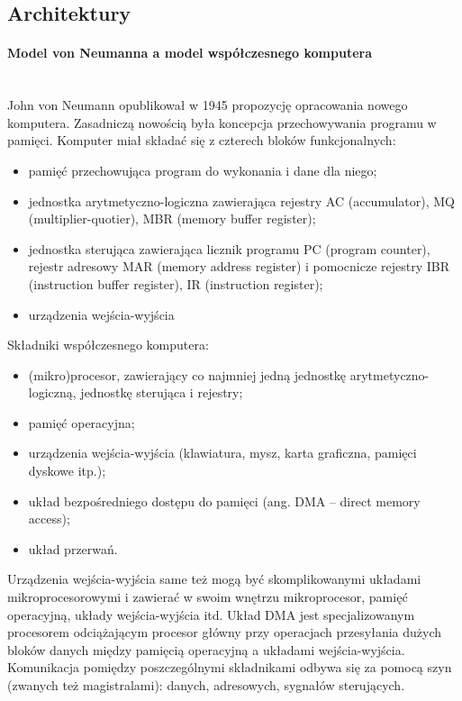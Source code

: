 \documentclass[a4paper,twoside]{report}
\begin{document}
\subsection{Architektury} 
 
\paragraph{Model von Neumanna a model współczesnego komputera\\\\} 
John von Neumann opublikował w 1945 propozycję opracowania nowego komputera. Zasadniczą nowością była
koncepcja przechowywania programu w pamięci. Komputer miał składać się z czterech bloków funkcjonalnych:
\begin{itemize}
\item pamięć przechowująca program do wykonania i dane dla niego;
\item jednostka arytmetyczno-logiczna zawierająca rejestry AC (accumulator), MQ (multiplier-quotier), MBR
(memory buffer register);
\item jednostka sterująca zawierająca licznik programu PC (program counter), rejestr adresowy MAR (memory
address register) i pomocnicze rejestry IBR (instruction buffer register), IR (instruction register);
\item urządzenia wejścia-wyjścia 
\end{itemize}


Składniki współczesnego komputera:
\begin{itemize}
\item (mikro)procesor, zawierający co najmniej jedną jednostkę arytmetyczno-logiczną, jednostkę sterująca i rejestry;
\item pamięć operacyjna;
\item urządzenia wejścia-wyjścia (klawiatura, mysz, karta graficzna, pamięci dyskowe itp.);
\item układ bezpośredniego dostępu do pamięci (ang. DMA – direct memory access);
\item układ przerwań.
\end{itemize}

Urządzenia wejścia-wyjścia same też mogą być skomplikowanymi układami mikroprocesorowymi i zawierać w swoim
wnętrzu mikroprocesor, pamięć operacyjną, układy wejścia-wyjścia itd. Układ DMA jest specjalizowanym procesorem odciążającym procesor główny przy operacjach przesyłania dużych bloków danych między pamięcią operacyjną a układami wejścia-wyjścia. Komunikacja pomiędzy poszczególnymi składnikami odbywa się za
pomocą szyn (zwanych też magistralami): danych, adresowych, sygnałów sterujących.
\end{document}
